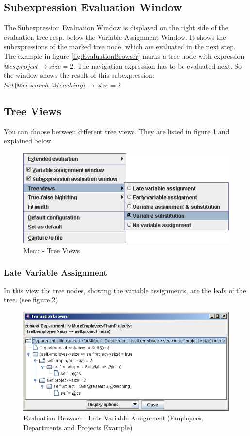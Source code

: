 \documentclass[a4paper,titlepage,oneside,final]{scrreprt} %
\begin{document}
\subsection{Subexpression Evaluation Window}
The Subexpression Evaluation Window is displayed on the right side of the evaluation tree
resp. below the Variable Assignment Window.
It shows the subexpressions of the marked tree node, which are evaluated in the
next step. The example in figure \ref{fig:EvaluationBrowser} marks a tree node with
expression $\mathit{@cs}.\mathit{project}\rightarrow\mathit{size}=2$. The navigation expression has to be evaluated
next. So the window shows the result of this subexpression:
$\mathit{Set}\{\mathit{@research},\mathit{@teaching}\}\rightarrow \mathit{size}=2$
\subsection{Tree Views}
You can choose between different tree views. They are listed in figure \ref{fig:EvaluationBrowserMenuTreeViews}
and explained below.
\begin{figure}[ht]
\centering
\includegraphics[scale=0.7]{Screenshots/GUI/EvaluationBrowserMenuTreeViews.png}
\caption{Menu - Tree Views}
\label{fig:EvaluationBrowserMenuTreeViews}
\end{figure}
\subsubsection{Late Variable Assignment}
In this view the tree nodes, showing the variable assignments, are the leafs of the tree.
(see figure \ref{fig:EvaluationBrowserLateAssignment})
\begin{figure}[ht]
\centering
\includegraphics[scale=0.7]{Screenshots/GUI/EvaluationBrowserLateAssignment.png}
\caption{Evaluation Browser - Late Variable Assignment (Employees, Departments and Projects Example)}
\label{fig:EvaluationBrowserLateAssignment}
\end{figure}
\end{document}
